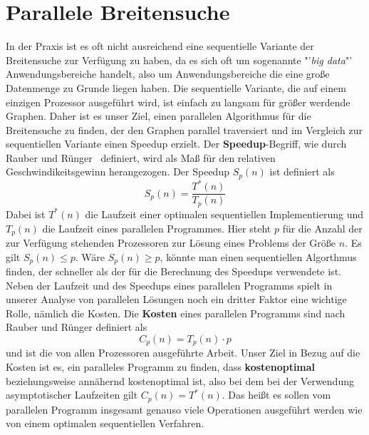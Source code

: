 \documentclass[11pt,a4paper]{article}
\begin{document}
\section{Parallele Breitensuche}
\label{parallel}
In der Praxis ist es oft nicht ausreichend eine sequentielle Variante der Breitensuche zur Verfügung zu haben, da es sich oft um sogenannte "'\textit{big data}"' Anwendungsbereiche handelt, also um Anwendungsbereiche die eine große Datenmenge zu Grunde liegen haben. Die sequentielle Variante, die auf einem einzigen Prozessor ausgeführt wird, ist einfach zu langsam für größer werdende Graphen. Daher ist es unser Ziel, einen parallelen Algorithmus für die Breitensuche zu finden, der den Graphen parallel traversiert und im Vergleich zur sequentiellen Variante einen Speedup erzielt. Der \textbf{Speedup}-Begriff, wie durch Rauber und Rünger~\cite{rauber} definiert, wird als Maß für den relativen Geschwindikeitsgewinn herangezogen. Der Speedup \(S_{p}(n)\) ist definiert als
\begin{equation}
	S_{p}(n) = \frac{T^{*}(n)}{T_{p}(n)}
\end{equation}
Dabei ist \(T^{*}(n)\) die Laufzeit einer optimalen sequentiellen Implementierung und \(T_{p}(n) \) die Laufzeit eines parallelen Programmes. Hier steht \(p\) für die Anzahl der zur Verfügung stehenden Prozessoren zur Lösung eines Problems der Größe \(n\). Es gilt \(S_{p}(n) \leq p\). Wäre \(S_{p}(n) \geq p\), könnte man einen sequentiellen Algorthmus finden, der schneller als der für die Berechnung des Speedups verwendete ist.\\
Neben der Laufzeit und des Speedups eines parallelen Programms spielt in unserer Analyse von parallelen Lösungen noch ein dritter Faktor eine wichtige Rolle, nämlich die Kosten. Die \textbf{Kosten} eines parallelen Programms sind nach Rauber und Rünger \cite{rauber} definiert als
\begin{equation}
	C_{p}(n) = T_{p}(n) \cdot p
 \end{equation}
und ist die von allen Prozessoren ausgeführte Arbeit. Unser Ziel in Bezug auf die Kosten ist es, ein paralleles Programm zu finden, dass \textbf{kostenoptimal} beziehungsweise annähernd kostenoptimal ist, also bei dem bei der Verwendung asymptotischer Laufzeiten gilt \(C_{p}(n) = T^{*}(n)\). Das heißt es sollen vom parallelen Programm insgesamt genauso viele Operationen ausgeführt werden wie von einem optimalen sequentiellen Verfahren.
\end{document}
